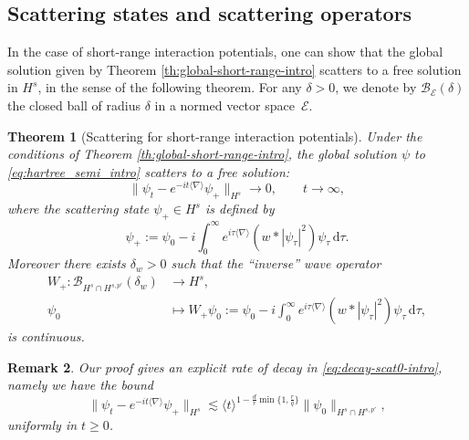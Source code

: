 \documentclass[12pt]{article}
\theoremstyle{plain}
\newtheorem{theo}{Theorem}[section]
\newtheorem{rem}[theo]{Remark}
\begin{document}
\subsection{Scattering states and scattering operators}

In the case of short-range interaction potentials, one can show that the global solution given by Theorem \ref{th:global-short-range-intro} scatters to a free solution in $H^s$, in the sense of the following theorem. For any $\delta>0$, we denote by  $\mathcal{B}_{\mathcal{E}}(\delta)$ the closed ball of radius $\delta$ in a normed vector space~$\mathcal{E}$.

	\begin{theo}[Scattering for short-range interaction potentials]
		\label{th:scattering-short-range-intro}
Under the conditions of Theorem \ref{th:global-short-range-intro}, the global solution $\psi$ to \eqref{eq:hartree_semi_intro} scatters to a free solution:
			\begin{equation}\label{eq:decay-scat0-intro}
			\| \psi_t - e^{-it\langle\nabla\rangle} \psi_+\|_{H^s} \to 0, \qquad t\to\infty,
		\end{equation}
		where the scattering state $\psi_+\in H^s$ is defined by
		\begin{equation}\label{eq:def_psi+}
			\psi_+ := \psi_0 - i \int_0^\infty e^{i\tau\langle\nabla\rangle} (w * |\psi_\tau|^2)\psi_\tau\, \mathrm{d}\tau.
		\end{equation}
Moreover there exists $\delta_w>0$ such that the ``inverse'' wave operator 
		\begin{align*}
    W_+:\mathcal{B}_{H^s\cap H^{s,p'}}(\delta_w)&\to H^s, \\ 
    \psi_0&\mapsto  W_+\psi_0:= \psi_0 - i \int_0^\infty e^{i\tau\langle\nabla\rangle} (w * |\psi_\tau|^2)\psi_\tau\, \mathrm{d}\tau,
\end{align*}
is continuous. 
	\end{theo}
	
\begin{rem}\label{rk:decay-scat0-intro-rate}
    Our proof gives an explicit rate of decay in \eqref{eq:decay-scat0-intro}, namely we have the bound
    \begin{equation}\label{eq:decay-scat0-intro-rate}
			\| \psi_t - e^{-it\langle\nabla\rangle} \psi_+\|_{H^s} \lesssim \langle t\rangle^{1-\frac dr \min\{1, \frac{r}{q}\}}\|\psi_0\|_{H^s\cap H^{s,p'}},
		\end{equation}
	uniformly in $t\ge0$.
\end{rem}
\end{document}
